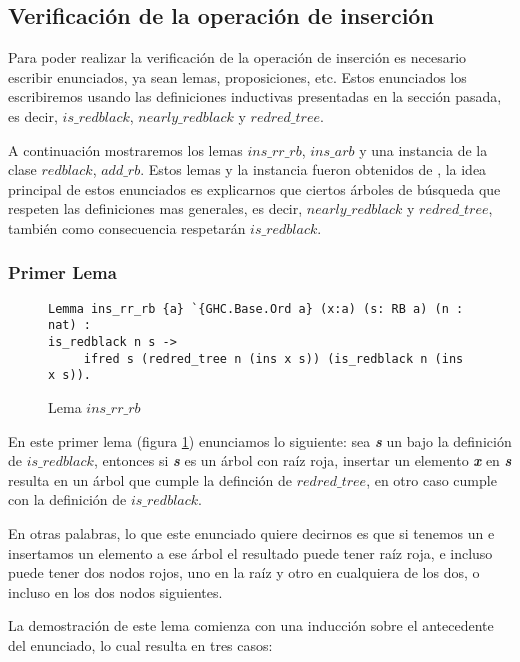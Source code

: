 \subsection{Verificación de la operación de inserción}

Para poder realizar la verificaci\'on de la operaci\'on de inserci\'on es necesario escribir
enunciados, ya sean lemas, proposiciones, etc. Estos enunciados los escribiremos usando las definiciones inductivas presentadas en
la secci\'on pasada, es decir, $is\_redblack$, $nearly\_redblack$ y $redred\_tree$.

A continuaci\'on mostraremos los lemas $ins\_rr\_rb$, $ins\_arb$ y una instancia \cite{classes}
de la clase $redblack$, $add\_rb$. Estos lemas y la instancia fueron obtenidos de \cite{MSetRBT},
la idea principal de estos enunciados es explicarnos que ciertos \'arboles de b\'usqueda que respeten las definiciones
mas generales, es decir, $nearly\_redblack$ y $redred\_tree$, también como consecuencia respetar\'an
$is\_redblack$.

\subsubsection{Primer Lema}

\begin{figure}[!ht]
\centering
\captionsetup{justification=centering}
\begin{verbatim}
Lemma ins_rr_rb {a} `{GHC.Base.Ord a} (x:a) (s: RB a) (n : nat) :
is_redblack n s ->
     ifred s (redred_tree n (ins x s)) (is_redblack n (ins x s)).
\end{verbatim}
\caption{Lema $ins\_rr\_rb$}
\label{lema_1}
\end{figure}

En este primer lema (figura \ref{lema_1}) enunciamos lo siguiente: sea \textit{\textbf{s}} un {\arn} bajo la
definici\'on de $is\_redblack$, entonces si \textit{\textbf{s}} es un \'arbol con raíz roja, insertar un elemento
\textit{\textbf{x}} en \textit{\textbf{s}} resulta en un \'arbol que cumple la definci\'on de $redred\_tree$, en otro caso cumple
con la definici\'on de $is\_redblack$.

En otras palabras, lo que este enunciado quiere decirnos es que si tenemos un {\arn} e insertamos
un elemento a ese \'arbol el resultado puede tener ra\'iz roja, e incluso puede tener dos nodos
rojos, uno en la ra\'iz y otro en cualquiera de los dos, o incluso en los dos nodos siguientes.

La demostraci\'on de este lema comienza con una inducci\'on sobre el antecedente del enunciado, lo cual
resulta en tres casos:

